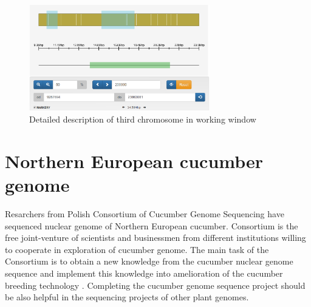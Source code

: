 \documentclass[a4paper]{spie}
\begin{document}
\begin{figure}[htp]
  \centering
  \includegraphics[width=0.7\textwidth]{img/skafoldy2.png}
  \caption{Detailed description of third chromosome in working window}
  \label{fig:chromosome}
\end{figure}

\section{Northern European cucumber genome}
Resarchers from Polish Consortium of Cucumber Genome Sequencing have sequenced nuclear genome of Northern European cucumber.
Consortium is the free joint-venture of scientists and businessmen from different institutions willing to cooperate in exploration of cucumber genome. The main task of the Consortium is to obtain a new knowledge from the cucumber nuclear genome sequence and implement this knowledge into amelioration of the cucumber breeding technology \cite{pawelkowicz2016next, przybecki2003isolation, przybecki2004polymorphom}. Completing the cucumber genome sequence project should be also helpful in the sequencing projects of other plant genomes.
\end{document}
